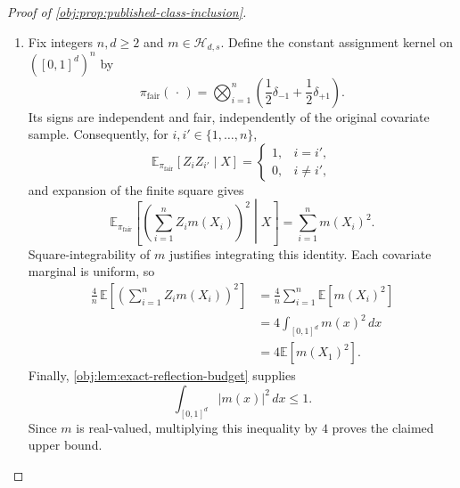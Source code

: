 \begin{proof}[Proof of \cref{obj:prop:published-class-inclusion}]
\begin{enumerate}
\item Fix integers \(n,d\geq2\) and \(m\in\mathcal H_{d,s}\). Define the constant assignment kernel on \(([0,1]^d)^n\) by
\[
\pi_{\mathrm{fair}}(\,\cdot\,)
=
\bigotimes_{i=1}^n
\left(\frac12\delta_{-1}+\frac12\delta_{+1}\right).
\]
Its signs are independent and fair, independently of the original covariate sample. Consequently, for \(i,i'\in\{1,\ldots,n\}\),
\[
\mathbb E_{\pi_{\mathrm{fair}}}[Z_iZ_{i'}\mid X]
=
\begin{cases}
1,&i=i',\\
0,&i\ne i',
\end{cases}
\]
and expansion of the finite square gives
\[
\mathbb E_{\pi_{\mathrm{fair}}}
\left[
\left(\sum_{i=1}^n Z_i m(X_i)\right)^2
\middle|X
\right]
=
\sum_{i=1}^n m(X_i)^2.
\]
Square-integrability of \(m\) justifies integrating this identity. Each covariate marginal is uniform, so
\[
\begin{aligned}
\frac4n\,\mathbb E
\left[
\left(\sum_{i=1}^n Z_i m(X_i)\right)^2
\right]
&=\frac4n\sum_{i=1}^n\mathbb E[m(X_i)^2]\\
&=4\int_{[0,1]^d}m(x)^2\,dx\\
&=4\mathbb E[m(X_1)^2].
\end{aligned}
\]
Finally, \cref{obj:lem:exact-reflection-budget} supplies
\[
\int_{[0,1]^d}|m(x)|^2\,dx\leq1.
\]
Since \(m\) is real-valued, multiplying this inequality by \(4\) proves the claimed upper bound.
\end{enumerate}
\end{proof}

